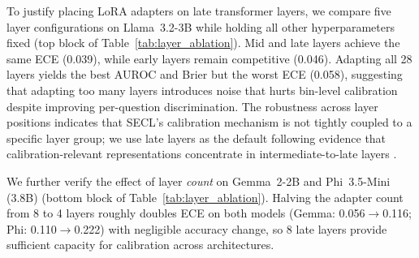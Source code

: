 To justify placing LoRA adapters on late transformer layers,
we compare five layer configurations on Llama~3.2-3B while holding
all other hyperparameters fixed (top block of Table~\ref{tab:layer_ablation}).
Mid and late layers achieve the same ECE (0.039), while early layers
remain competitive (0.046).
Adapting all 28 layers yields the best AUROC and Brier
but the worst ECE (0.058), suggesting that adapting too many layers
introduces noise that hurts bin-level calibration despite improving
per-question discrimination.
The robustness across layer positions
indicates that SECL's calibration mechanism is not tightly coupled
to a specific layer group; we use late layers as the default following
evidence that calibration-relevant representations concentrate in
intermediate-to-late layers \citep{du_haloscope_2024}.

We further verify the effect of layer \emph{count} on Gemma~2-2B and
Phi~3.5-Mini (3.8B) (bottom block of Table~\ref{tab:layer_ablation}).
Halving the adapter count from 8 to 4 layers roughly doubles ECE on
both models (Gemma: 0.056$\to$0.116; Phi: 0.110$\to$0.222) with
negligible accuracy change, so 8 late layers provide
sufficient capacity for calibration across architectures.

\begin{table}[htbp]
\centering
\small
{}%
\caption{LoRA layer ablation.
\textbf{Top:} layer position on Llama~3.2-3B (4 layers each except "All").
\textbf{Bottom:} layer count on Gemma~2-2B and Phi~3.5-Mini (3.8B).}
\label{tab:layer_ablation}
\end{table}

